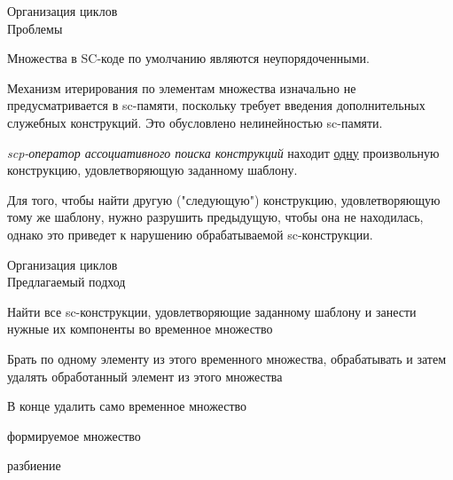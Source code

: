 \begin{frame}{Организация циклов\\Проблемы}
	\topline
	\justifying
	
	\begin{textitemize}
		\item Множества в SC-коде по умолчанию являются неупорядоченными.
		\item Механизм итерирования по элементам множества изначально не предусматривается в sc-памяти, поскольку требует введения дополнительных служебных конструкций. Это обусловлено нелинейностью sc-памяти.
		\item \textit{scp-оператор ассоциативного поиска конструкций} находит \underline{одну} произвольную конструкцию, удовлетворяющую заданному шаблону.
		\item Для того, чтобы найти другую ("следующую") конструкцию, удовлетворяющую тому же шаблону, нужно разрушить предыдущую, чтобы она не находилась, однако это приведет к нарушению обрабатываемой sc-конструкции.
	\end{textitemize}
	
\end{frame}

\begin{frame}{Организация циклов\\Предлагаемый подход}
	\topline
	\justifying
	
	\begin{textitemize}
		\item Найти все sc-конструкции, удовлетворяющие заданному шаблону и занести нужные их компоненты во временное множество
		\item Брать по одному элементу из этого временного множества, обрабатывать и затем удалять обработанный элемент из этого множества
		\item В конце удалить само временное множество
	\end{textitemize}
	
\end{frame}

\begin{frame}{формируемое множество\scnrolesign}
	\topline
	\justifying
	
	\begin{SCn}
		
		
			\begin{scnindent}
				\begin{scnrelfromset}{разбиение}
				\end{scnrelfromset}
			\end{scnindent}
			
	\end{SCn}
\end{frame}


